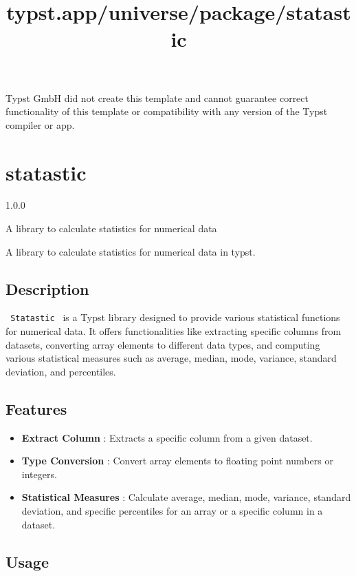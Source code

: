 Typst GmbH did not create this template and cannot guarantee correct
functionality of this template or compatibility with any version of the
Typst compiler or app.


\title{typst.app/universe/package/statastic}

\label{banner}
\section{statastic}\label{statastic}

{ 1.0.0 }

A library to calculate statistics for numerical data

\label{readme}
A library to calculate statistics for numerical data in typst.

\subsection{Description}\label{description}

\texttt{\ Statastic\ } is a Typst library designed to provide various
statistical functions for numerical data. It offers functionalities like
extracting specific columns from datasets, converting array elements to
different data types, and computing various statistical measures such as
average, median, mode, variance, standard deviation, and percentiles.

\subsection{Features}\label{features}

\begin{itemize}
\tightlist
\item
  \textbf{Extract Column} : Extracts a specific column from a given
  dataset.
\item
  \textbf{Type Conversion} : Convert array elements to floating point
  numbers or integers.
\item
  \textbf{Statistical Measures} : Calculate average, median, mode,
  variance, standard deviation, and specific percentiles for an array or
  a specific column in a dataset.
\end{itemize}

\subsection{Usage}\label{usage}

